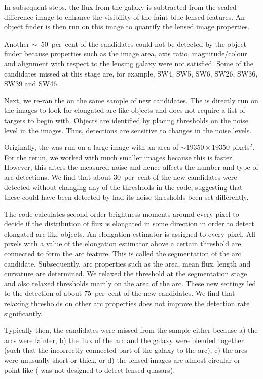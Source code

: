 \documentclass[useAMS,usenatbib,a4paper]{mn2e}
\begin{document}
In subsequent \rf steps, the flux from the galaxy is subtracted from the
scaled difference image to enhance the visibility of the faint blue
lensed features. An object finder is then run on this image to quantify the
lensed image properties.

Another $\sim$~50~per~cent of the \sw candidates could not be
detected by the object finder because properties such as the image area,
axis ratio, magnitude/colour and alignment with respect to the lensing
galaxy were not satisfied. Some of the candidates missed at this stage
are, for example, SW4, SW5, SW6, SW26, SW36, SW39 and SW46.

Next, we re-ran the \af on the same \sw sample of new candidates. The \af
is directly run on the images to look for elongated arc like objects and does
not require a list of targets to begin with. Objects are identified by
placing thresholds on the noise level in the images. Thus, \af
detections are sensitive to changes in the noise levels.

Originally, the \af was run on a large image with an area of $\sim 19350
\times 19350$ pixels$^2$. For the rerun, we worked with much smaller
images because this is faster. However, this alters the measured
noise and hence affects the number and type of arc detections. We find
that about 30~per~cent of the new candidates were detected without changing any
of the thresholds in the code, suggesting that these could have been detected by
\af had its noise thresholds been set differently.

The \af code calculates second order brightness moments around every
pixel to decide if the distribution of flux is elongated in some
direction in order to detect elongated arc-like objects. An elongation
estimator is assigned to every pixel. All pixels with a value of the
elongation estimator above a certain threshold are connected to form the arc
feature. This is called the segmentation of the arc candidate. Subsequently, arc
properties such as the area, mean flux, length and curvature are
determined. We relaxed the threshold at the segmentation stage and also relaxed
thresholds mainly on the area of the arc. These new settings led to the detection of
about 75~per~cent of the new \sw candidates. We find that relaxing thresholds
on other arc properties does not improve the detection rate significantly.

Typically then, the \sw candidates were missed from the \af sample
either because a) the arcs were fainter, b) the flux of the arc and the
galaxy were blended together (such that the \af incorrectly connected
part of the galaxy to the arc), c) the arcs were unusually short or
thick, or d) the lensed images are almost circular or point-like (\af
was not designed to detect lensed quasars).
\end{document}
